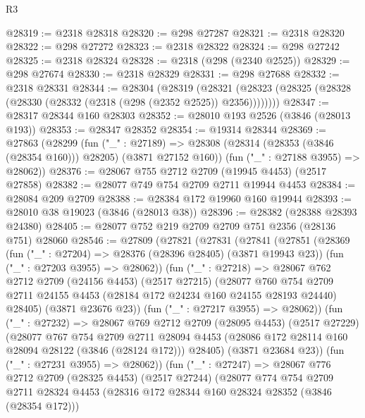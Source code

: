 \begin{lexlean}{R3}
\begin{coremodule}
@28319 := @2318 @28318
@28320 := @298 @27287
@28321 := @2318 @28320
@28322 := @298 @27272
@28323 := @2318 @28322
@28324 := @298 @27242
@28325 := @2318 @28324
@28328 := @2318 (@298 (@2340 @2525))
@28329 := @298 @27674
@28330 := @2318 @28329
@28331 := @298 @27688
@28332 := @2318 @28331
@28344 := @28304
    (@28319
      (@28321 (@28323 (@28325 (@28328 (@28330 (@28332 (@2318 (@298 (@2352 @2525)) @2356))))))))
@28347 := @28317 @28344 @160 @28303
@28352 := @28010 @193 @2526 (@3846 (@28013 @193))
@28353 := @28347 @28352
@28354 := @19314 @28344
@28369 := @27863
    (@28299
      (fun ("_" : @27189) =>
      @28308 (@28314 (@28353 (@3846 (@28354 @160))) @28205) (@3871 @27152 @160))
      (fun ("_" : @27188 @3955) => @28062))
@28376 := @28067 @755 @2712 @2709 (@19945 @4453) (@2517 @27858)
@28382 := @28077 @749 @754 @2709 @2711 @19944 @4453
@28384 := @28084 @209 @2709
@28388 := @28384 @172 @19960 @160 @19944
@28393 := @28010 @38 @19023 (@3846 (@28013 @38))
@28396 := @28382 (@28388 @28393 @24380)
@28405 := @28077 @752 @219 @2709 @2709 @751 @2356 (@28136 @751) @28060
@28546 := @27809
    (@27821
      (@27831
        (@27841
          (@27851
            (@28369
              (fun ("_" : @27204) => @28376 (@28396 @28405) (@3871 @19943 @23))
              (fun ("_" : @27203 @3955) => @28062))
            (fun ("_" : @27218) =>
            @28067
              @762
              @2712
              @2709
              (@24156 @4453)
              (@2517 @27215)
              (@28077
                @760
                @754
                @2709
                @2711
                @24155
                @4453
                (@28184 @172 @24234 @160 @24155 @28193 @24440)
                @28405)
              (@3871 @23676 @23))
            (fun ("_" : @27217 @3955) => @28062))
          (fun ("_" : @27232) =>
          @28067
            @769
            @2712
            @2709
            (@28095 @4453)
            (@2517 @27229)
            (@28077
              @767
              @754
              @2709
              @2711
              @28094
              @4453
              (@28086 @172 @28114 @160 @28094 @28122 (@3846 (@28124 @172)))
              @28405)
            (@3871 @23684 @23))
          (fun ("_" : @27231 @3955) => @28062))
        (fun ("_" : @27247) =>
        @28067
          @776
          @2712
          @2709
          (@28325 @4453)
          (@2517 @27244)
          (@28077
            @774
            @754
            @2709
            @2711
            @28324
            @4453
            (@28316 @172 @28344 @160 @28324 @28352 (@3846 (@28354 @172)))

\end{coremodule}
\end{lexlean}
